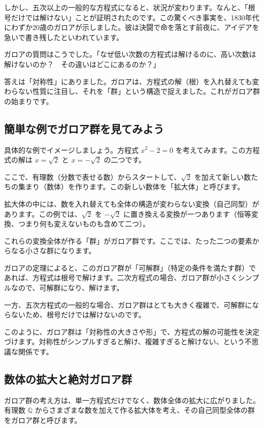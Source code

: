 \documentclass[dvipdfmx,12pt,a4paper]{jsarticle}
\begin{document}
しかし、五次以上の一般的な方程式になると、状況が変わります。なんと、「根号だけでは解けない」ことが証明されたのです。この驚くべき事実を、1830年代にわずか20歳のガロアが示しました。彼は決闘で命を落とす前夜に、アイデアを急いで書き残したといわれています。

ガロアの質問はこうでした。「なぜ低い次数の方程式は解けるのに、高い次数は解けないのか？　その違いはどこにあるのか？」

答えは「対称性」にありました。ガロアは、方程式の解（根）を入れ替えても変わらない性質に注目し、それを「群」という構造で捉えました。これがガロア群の始まりです。

\subsection{簡単な例でガロア群を見てみよう}

具体的な例でイメージしましょう。方程式 $x^2 - 2 = 0$ を考えてみます。この方程式の解は $x = \sqrt{2}$ と $x = -\sqrt{2}$ の二つです。

ここで、有理数（分数で表せる数）からスタートして、$\sqrt{2}$ を加えて新しい数たちの集まり（数体）を作ります。この新しい数体を「拡大体」と呼びます。

拡大体の中には、数を入れ替えても全体の構造が変わらない変換（自己同型）があります。この例では、$\sqrt{2}$ を $-\sqrt{2}$ に置き換える変換が一つあります（恒等変換、つまり何も変えないものも含めて二つ）。

これらの変換全体が作る「群」がガロア群です。ここでは、たった二つの要素からなる小さな群になります。

ガロアの定理によると、このガロア群が「可解群」（特定の条件を満たす群）であれば、方程式は根号で解けます。二次方程式の場合、ガロア群が小さくシンプルなので、可解群になり、解けます。

一方、五次方程式の一般的な場合、ガロア群はとても大きく複雑で、可解群にならないため、根号だけでは解けないのです。

このように、ガロア群は「対称性の大きさや形」で、方程式の解の可能性を決定づけます。対称性がシンプルすぎると解け、複雑すぎると解けない、という不思議な関係です。

\subsection{数体の拡大と絶対ガロア群}

ガロア群の考え方は、単一方程式だけでなく、数体全体の拡大に広がりました。有理数 $\mathbb{Q}$ からさまざまな数を加えて作る拡大体を考え、その自己同型全体の群をガロア群と呼びます。
\end{document}
